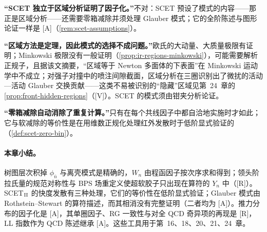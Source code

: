 \begin{tcolorbox}[enhanced,breakable,title=常见误解,fonttitle=\bfseries,
  colback=gray!3!white,colframe=gray!55!black,boxrule=0.6pt,arc=2pt,
  left=5pt,right=5pt,top=3pt,bottom=3pt,before skip=6pt,after skip=6pt]
\textbf{“SCET 独立于区域分析证明了因子化。”}不对：SCET 预设了模式的内容——那正是区域分析——还需要零箱减除并须处理 Glauber 模式；它的全阶陈述与图形论证一样是 [A]（\cref{rem:scet-assumptions}）。\par
\textbf{“区域方法是定理，因此模式的选择不成问题。”}欧氏的大动量、大质量极限有证明\cite{Smirnov:1990rz}；Minkowski 极限没有一般证明（\cref{prop:ir-regions-minkowski}），可能需要解析正规子，且据该文摘要，“区域等于 Newton 多面体的下表面”在 Minkowski 运动学中不成立\cite{Gardi:2024axt}；对强子对撞中的喷注间隙截面，区域分析在三圈识别出了微扰的活动—活动 Glauber 交换贡献\cite{Becher:2024kmk}——这类不易被识别的“隐藏”区域见第~24~章的\cref{prop:front-hidden-regions}（[V]）。SCET 的模式须由钳夹分析论证。\par
\textbf{“零箱减除自动消除了重复计算。”}只有在每个共线因子中都自洽地实施时才如此；它与软减除的等价性是在用维数正规化处理红外发散时于低阶显式验证的（\cref{def:scet-zero-bin}）。
\end{tcolorbox}

\paragraph{本章小结。}
树图层次积掉 $\phi_{\bar n}$ 与离壳模式是精确的，$W_n$ 由程函因子按次序求和得到；领头阶拉氏量的规范对称性与 BPS 场重定义使超软胶子只出现在算符的 $Y_n$ 中（[R]）。SCET$_{\rm II}$ 的快度发散有三种处理，它们的等价性在低阶显式验证；Glauber 模式由 Rothstein--Stewart 的算符描述，而其相消没有完整证明（二者均为 [A]）。推力分布的因子化是 [A]，其单圈因子、RG 一致性与对全 QCD 奇异项的再现是 [R]，LL 指数作为 QCD 陈述继承 [A]。这些工具用于第~16、18、20、21、24~章。

